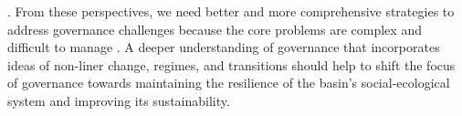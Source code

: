 \cite{qinFlexibilityintensityglobal2019,leviaHomogenizationterrestrialwater2020,grillMappingworldfreeflowing2019}.
From these perspectives, we need better and more comprehensive strategies to address governance challenges because the core problems are complex and difficult to manage
\cite{steffenemergenceevolutionEarth2020,muneepeerakulemergenceresilienceselforganized2020,bodinCollaborativeenvironmentalgovernance2017,biermannNavigatingAnthropoceneImproving2012}.
A deeper understanding of governance that incorporates ideas of non-liner change, regimes, and transitions should help to shift the focus of governance towards maintaining the resilience of the basin’s social-ecological system and improving its sustainability.
